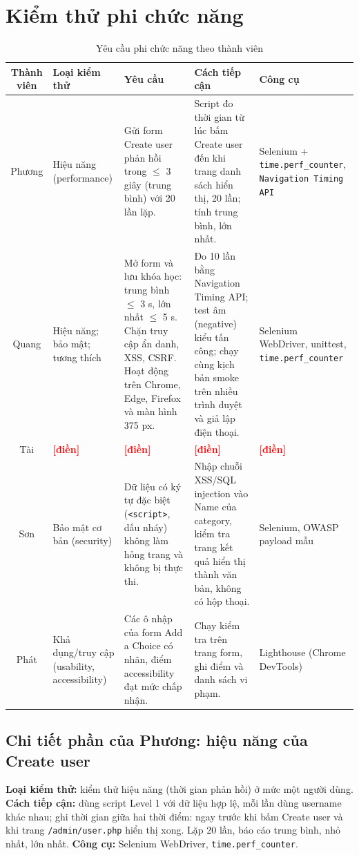 \documentclass[12pt,a4paper]{article}
\newcommand{\todo}[1]{\textcolor{red}{\textbf{[#1]}}}
\begin{document}
\section{Kiểm thử phi chức năng}\label{sec:nf}

\begin{table}[H]
\centering\footnotesize
\begin{tabular}{|c|L{2.4cm}|L{3.2cm}|L{3.6cm}|L{3.0cm}|}
\hline
{}\textbf{Thành viên} & \textbf{Loại kiểm thử} & \textbf{Yêu cầu} & \textbf{Cách tiếp cận} & \textbf{Công cụ} \\ \hline
Phương & Hiệu năng (performance) & Gửi form Create user phản hồi trong $\le$ 3 giây (trung bình) với 20 lần lặp. & Script đo thời gian từ lúc bấm Create user đến khi trang danh sách hiển thị, 20 lần; tính trung bình, lớn nhất. & Selenium + \texttt{time.perf\_counter}, \texttt{Navigation Timing API} \\ \hline
Quang & Hiệu năng; bảo mật; tương thích & Mở form và lưu khóa học: trung bình $\le$ 3 s, lớn nhất $\le$ 5 s. Chặn truy cập ẩn danh, XSS, CSRF. Hoạt động trên Chrome, Edge, Firefox và màn hình 375 px. & Đo 10 lần bằng Navigation Timing API; test âm (negative) kiểu tấn công; chạy cùng kịch bản smoke trên nhiều trình duyệt và giả lập điện thoại. & Selenium WebDriver, unittest, \texttt{time.perf\_counter} \\ \hline
Tài & \todo{điền} & \todo{điền} & \todo{điền} & \todo{điền} \\ \hline
Sơn & Bảo mật cơ bản (security) & Dữ liệu có ký tự đặc biệt (\verb|<script>|, dấu nháy) không làm hỏng trang và không bị thực thi. & Nhập chuỗi XSS/SQL injection vào Name của category, kiểm tra trang kết quả hiển thị thành văn bản, không có hộp thoại. & Selenium, OWASP payload mẫu \\ \hline
Phát & Khả dụng/truy cập (usability, accessibility) & Các ô nhập của form Add a Choice có nhãn, điểm accessibility đạt mức chấp nhận. & Chạy kiểm tra trên trang form, ghi điểm và danh sách vi phạm. & Lighthouse (Chrome DevTools) \\ \hline
\end{tabular}
\caption{Yêu cầu phi chức năng theo thành viên}
\end{table}

\subsection{Chi tiết phần của Phương: hiệu năng của Create user}
\textbf{Loại kiểm thử:} kiểm thử hiệu năng (thời gian phản hồi) ở mức một người dùng.
\textbf{Cách tiếp cận:} dùng script Level 1 với dữ liệu hợp lệ, mỗi lần dùng username khác nhau; ghi thời gian giữa hai thời điểm: ngay trước khi bấm Create user và khi trang \texttt{/admin/user.php} hiển thị xong. Lặp 20 lần, báo cáo trung bình, nhỏ nhất, lớn nhất.
\textbf{Công cụ:} Selenium WebDriver, \texttt{time.perf\_counter}.
\end{document}
